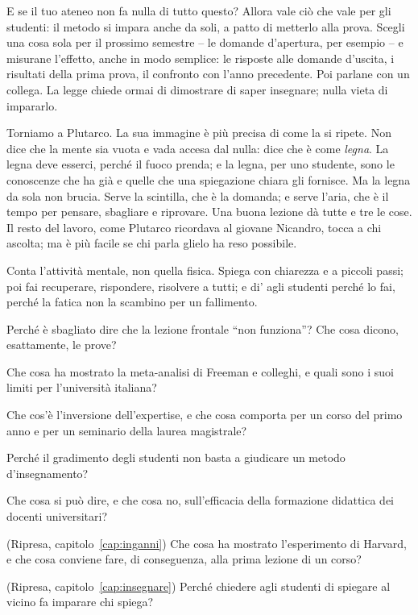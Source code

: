 E se il tuo ateneo non fa nulla di tutto questo? Allora vale ciò che
vale per gli studenti: il metodo si impara anche da soli, a patto di
metterlo alla prova. Scegli una cosa sola per il prossimo semestre --
le domande d'apertura, per esempio -- e misurane l'effetto, anche in
modo semplice: le risposte alle domande d'uscita, i risultati della
prima prova, il confronto con l'anno precedente. Poi parlane con un
collega. La legge chiede ormai di dimostrare di saper insegnare; nulla
vieta di impararlo.

\asterismo

Torniamo a Plutarco. La sua immagine è più precisa di come la
si ripete. Non dice che la mente sia vuota e vada accesa dal nulla:
dice che è come \emph{legna}. La legna deve esserci, perché il fuoco
prenda; e la legna, per uno studente, sono le conoscenze che ha già e
quelle che una spiegazione chiara gli fornisce. Ma la legna da sola
non brucia. Serve la scintilla, che è la domanda; e serve l'aria, che
è il tempo per pensare, sbagliare e riprovare. Una buona lezione dà
tutte e tre le cose. Il resto del lavoro, come Plutarco ricordava al
giovane Nicandro, tocca a chi ascolta; ma è più facile se chi parla
glielo ha reso possibile.

\begin{daricordare}
Conta l'attività mentale, non quella fisica. Spiega con chiarezza e a
piccoli passi; poi fai recuperare, rispondere, risolvere a tutti; e di'
agli studenti perché lo fai, perché la fatica non la scambino per un
fallimento.
\end{daricordare}

\begin{domande}
  \item Perché è sbagliato dire che la lezione frontale \enquote{non
        funziona}? Che cosa dicono, esattamente, le prove?
  \item Che cosa ha mostrato la meta-analisi di Freeman e colleghi, e
        quali sono i suoi limiti per l'università italiana?
  \item Che cos'è l'inversione dell'expertise, e che cosa comporta per
        un corso del primo anno e per un seminario della laurea
        magistrale?
  \item Perché il gradimento degli studenti non basta a giudicare un
        metodo d'insegnamento?
  \item Che cosa si può dire, e che cosa no, sull'efficacia della
        formazione didattica dei docenti universitari?
  \item (Ripresa, capitolo~\ref{cap:inganni}) Che cosa ha mostrato
        l'esperimento di Harvard, e che cosa conviene fare, di
        conseguenza, alla prima lezione di un corso?
  \item (Ripresa, capitolo~\ref{cap:insegnare}) Perché chiedere agli
        studenti di spiegare al vicino fa imparare chi spiega?
\end{domande}

